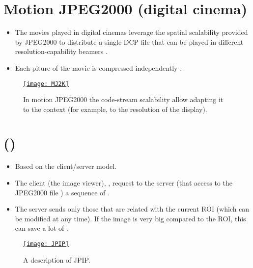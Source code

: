 \section{Motion JPEG2000 (digital cinema)}
\begin{itemize}
\item The movies played in digital cinemas leverage the spatial
  scalability provided by JPEG2000 to distribute a single DCP file
  that can be played in different resolution-capability beamers
  \cite{wikipedia_DCP}.
\item Each piture of the movie is compressed independently
  \cite{DigitalCinema}.
\end{itemize}

\begin{figure}[H]
  \vspace{-2ex}
  \centering
  \href{https://vicente-gonzalez-ruiz.github.io/JPEG2000/}{\texttt{[image: MJ2K]}}
  \caption{In motion JPEG2000 the code-stream scalability allow
    adapting it to the context (for example, to the resolution of the
    display).}
  \label{fig:J2K_motion}
\end{figure}

\section{ ({)}}
\begin{itemize}
\item Based on the client/server model.
\item The client (the image viewer), , request to the server (that access to the
  JPEG2000 file ) a sequence
  of  \cite{ORTIZ04b}.
\item The server sends only those  that are related with the current
  \gls{ROI} (which can be modified at any time). If the image is very
  big compared to the \gls{ROI}, this can save a lot of
  .
\end{itemize}

\begin{figure}[H]
  \vspace{-1ex}
  \centering
  \href{http://www.hpca.ual.es/~vruiz/papers/ORTIZ04c.pdf}{\texttt{[image: JPIP]}}
  \caption{A description of \gls{JPIP}.}
  \label{fig:J2K_JPIP}
\end{figure}

